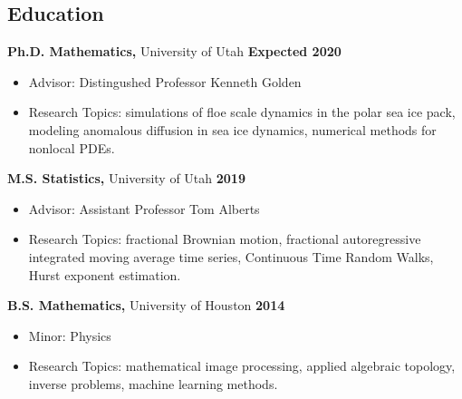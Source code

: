 \documentclass[margin,line]{res}
\begin{document}
\newcommand{\myname}{Huy Dinh}
\newlength{\mynamewidth}
\settowidth{\mynamewidth}{\namefont\myname}

\name{\hspace*{0.5\textwidth}\hspace{-0.5\mynamewidth} \myname \vspace*{.2in}}

\thispagestyle{empty}

\begin{resume}



\section{\sc Education}
{\bf Ph.D. Mathematics,} University of Utah \hfill {\bf Expected 2020}\\
\vspace*{-.1in}
\begin{itemize} \setlength\itemsep{0em}
\item[ ] Advisor: Distingushed Professor Kenneth Golden
\item[ ] Research Topics: simulations of floe scale dynamics in the polar sea ice pack, modeling anomalous diffusion in sea ice dynamics, numerical methods for nonlocal PDEs.
\end{itemize}

{\bf M.S. Statistics,} University of Utah \hfill {\bf 2019}\\
\vspace*{-.1in}
\begin{itemize} \setlength\itemsep{0em}
\item[ ] Advisor: Assistant Professor Tom Alberts
\item[ ] Research Topics: fractional Brownian motion, fractional autoregressive integrated moving average time series, Continuous Time Random Walks, Hurst exponent estimation.
\end{itemize}

{\bf B.S. Mathematics,} University of Houston \hfill {\bf 2014}\\
\vspace*{-.1in}
\begin{itemize} \setlength\itemsep{0em}
\item[ ] Minor: Physics
\item[ ] Research Topics: mathematical image processing, applied algebraic topology, inverse problems, machine learning methods.
\end{itemize}


\end{resume}
\end{document}
